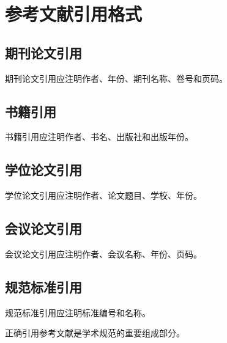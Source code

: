 \section{参考文献引用格式}
\subsection{期刊论文引用}
期刊论文引用应注明作者、年份、期刊名称、卷号和页码\cite{smith2022,zhang2020}。

\subsection{书籍引用}
书籍引用应注明作者、书名、出版社和出版年份\cite{book2021}。

\subsection{学位论文引用}
学位论文引用应注明作者、论文题目、学校、年份\cite{thesis2020}。

\subsection{会议论文引用}
会议论文引用应注明作者、会议名称、年份、页码\cite{conference2023}。

\subsection{规范标准引用}
规范标准引用应注明标准编号和名称\cite{standard2018}。

正确引用参考文献是学术规范的重要组成部分。